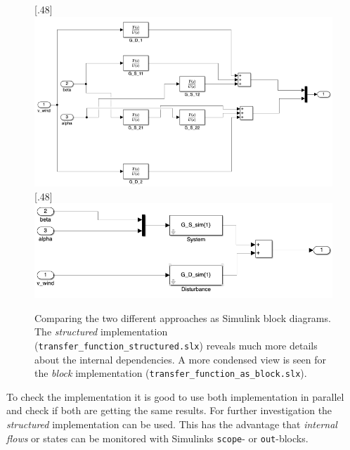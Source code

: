 \begin{figure}[H]
    \centering

    [.48\textwidth]{\includegraphics[width=1\linewidth, scale=1, trim=0 0 0 0,clip]{fig/Simulink/simulink_tf_structure.png}}
%
    [.48\textwidth]{\includegraphics[width=1\linewidth, scale=1, trim=0 0 0 0,clip]{fig/Simulink/simulink_tf_block.png}}

    \caption{Comparing the two different approaches as Simulink block diagrams. The \textit{structured} implementation (\texttt{transfer\_function\_structured.slx}) reveals much more details about the internal dependencies. A more condensed view is seen for the \textit{block} implementation (\texttt{transfer\_function\_as\_block.slx}).}
    \label{fig:condes:implementation:two_approaches}
\end{figure}

To check the implementation it is good to use both implementation in parallel and check if both are getting the same results.
For further investigation the \textit{structured} implementation can be used.
This has the advantage that \textit{internal flows} or states can be monitored with Simulinks \texttt{scope}- or \texttt{out}-blocks.

